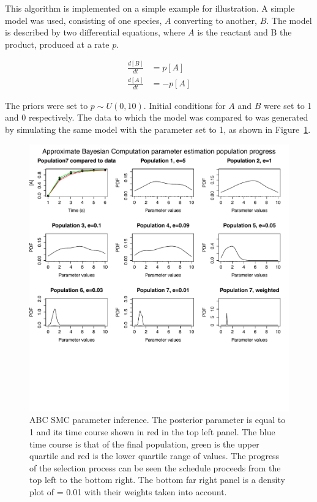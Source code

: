 This algorithm is implemented on a simple example for illustration. A simple model was used, consisting of one species, $A$ converting to another, $B$. The model is described by two differential equations, where $A$ is the reactant and B the product, produced at a rate $p$. 

\begin{align}
\frac{d[B]}{dt} &= p[A] \\ 
\frac{d[A]}{dt} &= -p[A] 
\end{align}

The priors were set to $p \sim U(0, 10)$. Initial conditions for $A$ and $B$ were set to 1 and 0 respectively. The data to which the model was compared to was generated by simulating the same model with the parameter set to 1, as shown in Figure~\ref{fig:myABC true 1}.

\begin{figure}[htbp]
    \begin{center}
    \includegraphics[scale=0.6]{chapterIntroduction/images/abcsmc_ex.pdf}
    \caption[\acrshort{abc} \acrshort{smc} example]{ABC SMC parameter inference. The posterior parameter is equal to 1 and its time course shown in red in the top left panel. The blue time course is that of the final population, green is the upper quartile and red is the lower quartile range of values. The progress of the selection process can be seen the \textepsilon schedule proceeds from the top left to the bottom right. The bottom far right panel is a density plot of \textepsilon = 0.01 with their weights taken into account.  }
    \label{fig:myABC true 1}
    \end{center}
\end{figure}
\clearpage

